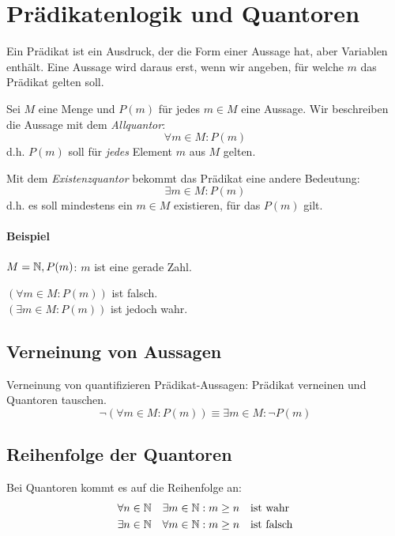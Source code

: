 \section{Prädikatenlogik und Quantoren}
Ein Prädikat ist ein Ausdruck, der die Form einer Aussage hat, aber Variablen enthält.
Eine Aussage wird daraus erst, wenn wir angeben, für welche $m$ das Prädikat gelten soll.

Sei $M$ eine Menge und $P(m)$ für jedes $m\in M$ eine Aussage. Wir beschreiben die Aussage mit dem \emph{Allquantor}:
\begin{equation*}
  \forall m\in M: P(m)
\end{equation*}
d.h. $P(m)$ soll für \emph{jedes} Element $m$ aus $M$ gelten.
\par\medskip
Mit dem \emph{Existenzquantor} bekommt das Prädikat eine andere Bedeutung:
\begin{equation*}
  \exists m\in M: P(m)
\end{equation*}
d.h. es soll mindestens ein $m\in M$ existieren, für das $P(m)$ gilt.

\paragraph{Beispiel}
$M=\mathbb{N}, P(m)$: \glqq $m$ ist eine gerade Zahl.\grqq

$(\forall m\in M: P(m))$ ist falsch. \\
$(\exists m\in M: P(m))$ ist jedoch wahr.

\subsection{Verneinung von Aussagen}
Verneinung von quantifizieren Prädikat-Aussagen:
\glqq Prädikat verneinen und Quantoren tauschen.\grqq
\begin{equation*}
  \neg(\forall m\in M: P(m)) \equiv  \exists m\in M: \neg P(m)
\end{equation*}
\subsection{Reihenfolge der Quantoren}
Bei Quantoren kommt es auf die Reihenfolge an:
\begin{align*}
  \forall n\in\mathbb{N} \quad\exists m\in \mathbb{N} &: m\geq n \quad\text{ist wahr}\\
  \exists n\in\mathbb{N} \quad\forall m\in \mathbb{N} &: m\geq n \quad\text{ist falsch}\\
\end{align*}
